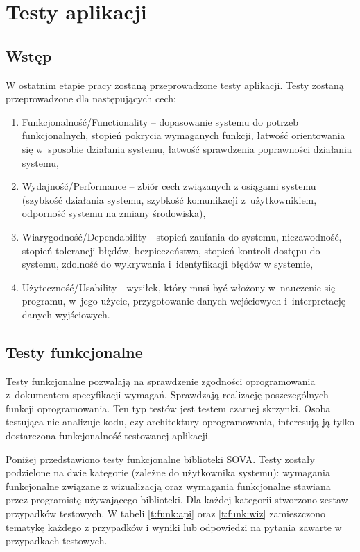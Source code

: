 \chapter{Testy aplikacji}
\vspace*{1 cm}
\section{Wstęp}
W ostatnim etapie pracy zostaną przeprowadzone testy aplikacji. Testy zostaną przeprowadzone dla następujących cech:
\begin{enumerate}
 \item Funkcjonalność/Functionality – dopasowanie systemu do potrzeb funkcjonalnych, stopień pokrycia wymaganych funkcji, łatwość orientowania się w~sposobie działania 
systemu, łatwość sprawdzenia poprawności działania systemu,
 \item Wydajność/Performance – zbiór cech związanych z osiągami systemu (szybkość działania systemu, szybkość komunikacji z~użytkownikiem, odporność systemu 
na zmiany środowiska),
 \item Wiarygodność/Dependability - stopień zaufania do systemu, niezawodność, stopień tolerancji błędów, bezpieczeństwo, stopień kontroli dostępu do systemu,
 zdolność do wykrywania i~identyfikacji błędów w systemie,
 \item Użyteczność/Usability - wysiłek, który musi być włożony w~nauczenie się programu, w~jego użycie, przygotowanie danych wejściowych i~interpretację danych
 wyjściowych.
 
\end{enumerate}

\section{Testy funkcjonalne}
Testy funkcjonalne pozwalają na sprawdzenie zgodności oprogramowania z~dokumentem specyfikacji wymagań. Sprawdzają realizację poszczególnych funkcji oprogramowania. 
Ten typ testów jest testem czarnej skrzynki. Osoba testująca nie analizuje kodu, czy architektury oprogramowania, interesują ją tylko dostarczona funkcjonalność  
testowanej aplikacji. 
\par 
Poniżej przedstawiono testy funkcjonalne biblioteki SOVA. Testy zostały podzielone na dwie kategorie (zależne do użytkownika systemu): wymagania funkcjonalne
 związane z wizualizacją oraz wymagania funkcjonalne stawiana przez programistę używającego biblioteki. Dla każdej kategorii stworzono zestaw przypadków 
testowych. W tabeli \ref{t:funk:api} oraz \ref{t:funk:wiz} zamieszczono tematykę każdego z przypadków i wyniki lub odpowiedzi na pytania zawarte w przypadkach testowych. 

